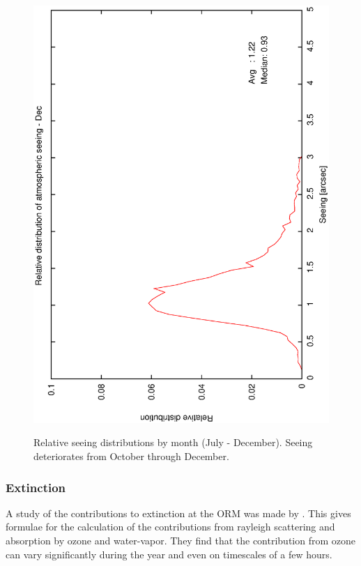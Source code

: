 {{\begin{figure}[htbp]
\begin{center}
{   \includegraphics[scale=0.25, angle=-90]{figures/ecs/corr_see_dist_dec.eps} 
   \label{fig:see_dist_dec}
  }
 \end{center}
 \caption[Relative seeing distributions by month (July - December).]
	 {Relative seeing distributions by month (July - December). Seeing deteriorates from October through December.}
\label{fig:see_dist_juldec}
\end{figure}

\subsubsection{Extinction}
A study of the contributions to extinction at the ORM was made by \citet{lapalma31}. This gives formulae for the calculation of the contributions from rayleigh scattering and absorption by ozone and water-vapor. They find that the contribution from ozone can vary significantly during the year and even on timescales of a few hours.

}}
